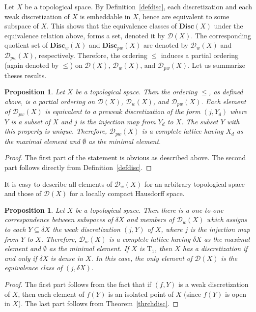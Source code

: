 \documentclass[manuscript]{amsart}
\newtheorem{proposition}[theorem]{Proposition}
\theoremstyle{definition}
\begin{document}
Let $X$ be a topological space. By Definition~\ref{defdisc},
each discretization and each weak discretization of $X$
is embeddable in $X$, hence  are equivalent to
some subspace of $X$.
This shows that the equivalence classes of
 $\mathbf{Disc}(X)$ under the equivalence relation  above, forms
 a set,   denoted it by
 $\mathcal{D}(X)$. The corresponding quotient set of
 $\mathbf{Disc}_{w}(X)$ and $\mathbf{Disc}_{pw}(X)$ are denoted
 by $\mathcal{D}_{w}(X)$ and $\mathcal{D}_{pw}(X)$, respectively.
 Therefore, the ordering $\leq$ induces a partial ordering
 (again denoted by $\leq$)
 on  $\mathcal{D}(X)$,  $\mathcal{D}_{w}(X)$, and $\mathcal{D}_{pw}(X)$.
 Let us summarize theses results.
 \begin{proposition}
 Let $X$ be a topological space.
 Then the ordering $\leq$, as defined above, is a partial ordering on
 $\mathcal{D}(X)$,  $\mathcal{D}_{w}(X)$, and $\mathcal{D}_{pw}(X)$.
Each element of $\mathcal{D}_{pw}(X)$ is equivalent to a preweak discretization
of the form $(j,Y_{d})$ where $Y$ is a subset of $X$
and $j$ is the injection map from $Y_{d}$ to $X$. The subset $Y$ with this property
is unique. Therefore, $\mathcal{D}_{pw}(X)$ is a complete lattice
having $ X_{d}$ as the maximal element and $\emptyset$ as the minimal element.
 \end{proposition}
\begin{proof}
The first part of the statement is obvious as described above. The second part follows directly from
Definition~\ref{defdisc}.
\end{proof}
 It is easy to describe all elements of  $\mathcal{D}_{w}(X)$ for an arbitrary topological space
 and  those of $\mathcal{D}(X)$ for a  locally compact  Hausdorff space.
 \begin{proposition}\label{propwdisc}
Let $X$ be a topological space. Then there is a one-to-one
correspondence between subspaces of $\delta X$ and  members of $\mathcal{D}_{w}(X)$
which assigns to each $Y\subseteq\delta X$ the weak discretization $(j,Y)$ of $X$, where $j$ is
the injection map from $Y$ to $X$. Therefore, $\mathcal{D}_{w}(X)$ is a complete
lattice having $\delta X$ as the maximal element and $\emptyset$ as the minimal element.
If $X$ is $\mathrm{T}_{1}$, then $X$ has a discretization if and only if
$\delta X$ is dense in $X$. In this case, the only element of $\mathcal{D}(X)$ is
the equivalence class of $(j,\delta X)$.
\end{proposition}
\begin{proof}
The first part  follows from the fact that
if $(f,Y)$ is a weak discretization of $X$, then each element of $f(Y)$ is an isolated point of $X$
(since $f(Y)$ is open in $X$). The last part follows from
Theorem~\ref{thrchdisc}.
\end{proof}
\end{document}
